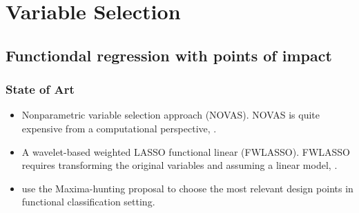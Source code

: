 \documentclass[
]{book}
\begin{document}
\newcommand{\I}{\mathbb{I}}
\newcommand{\Z}{\mathbb{Z}}
\newcommand{\N}{\mathbb{N}}
\newcommand{\lp}{\left(}
\newcommand{\rp}{\right)}
\newcommand{\lc}{\left[}
\newcommand{\rc}{\right]}
\newcommand{\lb}{\left\{}
\newcommand{\rb}{\right\}}
\newcommand{\lf}{\left.}
\newcommand{\ri}{\right.}
\newcommand{\id}{\stackrel{d}{=}}
\newcommand{\prob}[1]{\PR\lp#1\rp}
\newcommand{\esp}[2]{\mathbf{E}_#1\lc#2\rc}
\newcommand{\espe}[1]{\mathbf{E}\lc#1\rc}
\providecommand{\abs}[1]{\left|#1\right|}

\newcommand{\sign}{\textrm{sign}}
\newcommand{\corr}[2]{\textrm{Corr}\lp#1,#2\rp}
\newcommand{\cov}[2]{\textrm{Cov}\lp#1,#2\rp}
\newcommand{\Cov}[1]{\textrm{Cov}\lp#1\rp}
\newcommand{\var}[1]{\textrm{Var}\lp#1\rp}

\newcommand{\E}[1]{\mathbf{E}\lc #1\rc}
\newcommand{\V}[1]{\mathbb{V}\mathrm{ar}\lc #1\rc}
\newcommand{\Es}[2]{\mathbf{E}_{#2}\lc #1\rc}
\newcommand{\Vs}[2]{\mathbb{V}\mathrm{ar}_{#2}\lc #1\rc}
\newcommand{\mse}[1]{\mathrm{MSE}\lrc{#1}}
\newcommand{\mise}[1]{\mathrm{MISE}\lrc{#1}}
\newcommand{\amise}[1]{\mathrm{AMISE}\lrc{#1}}

\newcommand{\norm}[1]{\left|\left| #1\right|\right|}
\newcommand{\tr}[1]{\text{tr}\left[#1\right]}
\newcommand{\inprod}[2]{\langle#1,#2\rangle}

\newcommand{\vlinel}[1]{\multicolumn{1}{|c}{#1}}
\newcommand{\vliner}[1]{\multicolumn{1}{c|}{#1}}

\newcommand{\bb}[1]{\mathbb{#1}}
\newcommand{\mat}[1]{\mathbf{#1}}
\newcommand{\ind}[1]{\mathbbm{1}_{\lrb{#1}}}
\newcommand{\DC}{\mathcal{R}}

\hypertarget{variable-selection}{%
\chapter{Variable Selection}\label{variable-selection}}

\hypertarget{functiondal-regression-with-points-of-impact}{%
\section{Functiondal regression with points of impact}\label{functiondal-regression-with-points-of-impact}}

\hypertarget{state-of-art}{%
\subsection{State of Art}\label{state-of-art}}

\begin{itemize}
\item
  Nonparametric variable selection approach (NOVAS). NOVAS is quite expensive from a computational perspective, \citet{ferraty2010most}.
\item
  A wavelet-based weighted LASSO functional linear (FWLASSO).
  FWLASSO requires transforming the original variables and assuming a linear model, \citet{Zhao2015}.
\item
  \citet{berrendero2016variable} use the Maxima-hunting proposal to choose the most relevant design points in functional classification setting.
\end{itemize}
\end{document}
